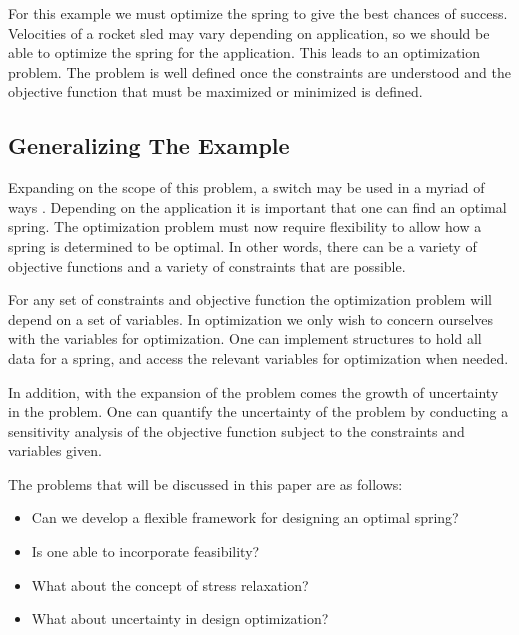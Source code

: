 \documentclass[10pt]{article}
\begin{document}
For this example we must optimize the spring to give the best chances of success. Velocities of a rocket sled may vary depending on application, so we should be able to optimize the spring for the application. This leads to an optimization problem. The problem is well defined once the constraints are understood and the objective function that must be maximized or minimized is defined. 

\subsection{Generalizing The Example}
Expanding on the scope of this problem, a switch may be used in a myriad of ways \cite{SpringDevice}. Depending on the application it is important that one can find an optimal spring. The optimization problem must now require flexibility to allow how a spring is determined to be optimal. In other words, there can be a variety of objective functions and a variety of constraints that are possible.   

For any set of constraints and objective function the optimization problem will depend on a set of variables. In optimization we only wish to concern ourselves with the variables for optimization. One can implement structures to hold all data for a spring, and access the relevant  variables for optimization when needed. 

In addition, with the expansion of the problem comes the growth of uncertainty in the problem. One can quantify the uncertainty of the problem by conducting a sensitivity analysis of the objective function subject to the constraints and variables given. 
\newline

The problems that will be discussed in this paper are as follows: 
\begin{itemize}
	\item Can we develop a flexible framework for designing an optimal spring?

	\item Is one able to incorporate feasibility?
	
	\item What about the concept of stress relaxation?
	
	\item What about uncertainty in design optimization? 
	
	
\end{itemize}
\end{document}
